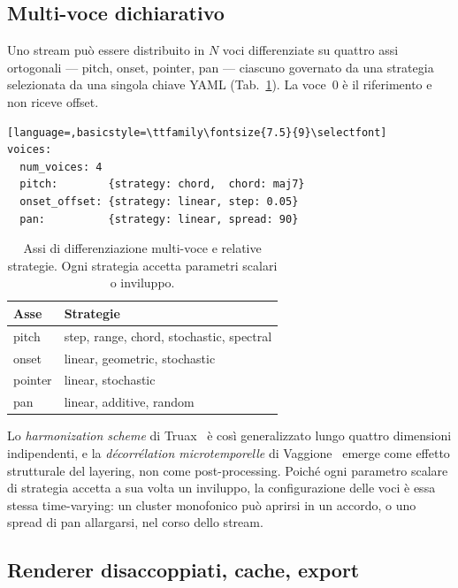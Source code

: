 \documentclass[10pt,twocolumn,a4paper]{article}
\renewcommand{\small}{\fontsize{8}{10}\selectfont}
\begin{document}
\subsection{Multi-voce dichiarativo}

Uno stream può essere distribuito in $N$ voci differenziate su quattro
assi ortogonali --- pitch, onset, pointer, pan --- ciascuno governato da
una strategia selezionata da una singola chiave YAML (Tab.~\ref{tab:voci}).
La voce~0 è il riferimento e non riceve offset.

\begin{lstlisting}[language=,basicstyle=\ttfamily\fontsize{7.5}{9}\selectfont]
voices:
  num_voices: 4
  pitch:        {strategy: chord,  chord: maj7}
  onset_offset: {strategy: linear, step: 0.05}
  pan:          {strategy: linear, spread: 90}
\end{lstlisting}

\begin{table}[t]
  \centering\small
  \begin{tabular}{@{}ll@{}}
    \hline
    \textbf{Asse} & \textbf{Strategie}\\
    \hline
    pitch   & step, range, chord, stochastic, spectral\\
    onset   & linear, geometric, stochastic\\
    pointer & linear, stochastic\\
    pan     & linear, additive, random\\
    \hline
  \end{tabular}
  \caption{Assi di differenziazione multi-voce e relative strategie.
    Ogni strategia accetta parametri scalari o inviluppo.}
  \label{tab:voci}
\end{table}

Lo \emph{harmonization scheme} di Truax~\cite{Truax1994} è così
generalizzato lungo quattro dimensioni indipendenti, e la
\emph{décorrélation microtemporelle} di Vaggione~\cite{Vaggione2002}
emerge come effetto strutturale del layering, non come post-processing.
Poiché ogni parametro scalare di strategia accetta a sua volta un
inviluppo, la configurazione delle voci è essa stessa time-varying: un
cluster monofonico può aprirsi in un accordo, o uno spread di pan
allargarsi, nel corso dello stream.

\subsection{Renderer disaccoppiati, cache, export}
\end{document}
